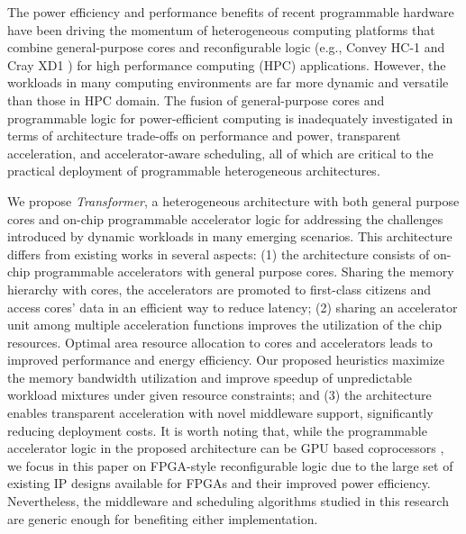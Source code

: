 The power efficiency \cite{hamada09,thomas09} and performance benefits
of recent programmable hardware have been driving the momentum of
heterogeneous computing platforms that combine general-purpose cores
and reconfigurable logic (e.g., Convey HC-1 \cite{brewer09} and Cray
XD1 \cite{Ulmer:2005vh}) for high performance computing (HPC)
applications. However, the workloads in many computing environments
are far more dynamic and versatile than those in HPC domain. The
fusion of general-purpose cores and programmable logic for
power-efficient computing is inadequately investigated in terms of
architecture trade-offs on performance and power, transparent
acceleration, and accelerator-aware scheduling, all of which are
critical to the practical deployment of programmable heterogeneous
architectures.

We propose {\em Transformer}, a heterogeneous architecture with both
general purpose cores and on-chip programmable accelerator logic for
addressing the challenges introduced by dynamic workloads in many
emerging scenarios. This architecture differs from existing works in
several aspects: (1) the architecture consists of on-chip programmable
accelerators with general purpose cores.  Sharing the memory hierarchy
with cores, the accelerators are promoted to first-class citizens and
access cores' data in an efficient way to reduce latency;  
(2) sharing an accelerator unit among multiple acceleration functions
improves the utilization of the chip resources. Optimal area resource
allocation to cores and accelerators leads to improved performance and
energy efficiency. Our proposed heuristics maximize the memory
bandwidth utilization and improve speedup of unpredictable workload
mixtures under given resource constraints; and (3) the architecture
enables transparent acceleration with novel middleware support,
significantly reducing deployment costs.  It is worth noting that,
while the programmable accelerator logic in the proposed architecture
can be GPU based coprocessors \cite{intel-gpu}, we focus in this paper
on FPGA-style reconfigurable logic due to the large set of existing IP
designs available for FPGAs and their improved power
efficiency. Nevertheless, the middleware and scheduling algorithms
studied in this research are generic enough for benefiting either
implementation.

